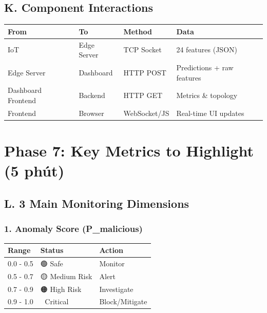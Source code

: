 \documentclass[12pt,a4paper]{article}
\begin{document}
\subsection{K. Component Interactions}

\begin{table}[h]
\centering
\begin{tabularx}{\textwidth}{|l|l|l|l|}
\hline
\textbf{From} & \textbf{To} & \textbf{Method} & \textbf{Data} \\
\hline
IoT & Edge Server & TCP Socket & 24 features (JSON) \\
\hline
Edge Server & Dashboard & HTTP POST & Predictions + raw features \\
\hline
Dashboard Frontend & Backend & HTTP GET & Metrics \& topology \\
\hline
Frontend & Browser & WebSocket/JS & Real-time UI updates \\
\hline
\end{tabularx}
\end{table}

\section{Phase 7: Key Metrics to Highlight (5 phút)}

\subsection{L. 3 Main Monitoring Dimensions}

\subsubsection{1. Anomaly Score (P\_malicious)}

\begin{table}[h]
\centering
\begin{tabularx}{\textwidth}{|l|X|X|}
\hline
\textbf{Range} & \textbf{Status} & \textbf{Action} \\
\hline
0.0 - 0.5 & 🟢 Safe & Monitor \\
\hline
0.5 - 0.7 & 🟡 Medium Risk & Alert \\
\hline
0.7 - 0.9 & 🟠 High Risk & Investigate \\
\hline
0.9 - 1.0 & 🔴 Critical & Block/Mitigate \\
\hline
\end{tabularx}
\end{table}
\end{document}
